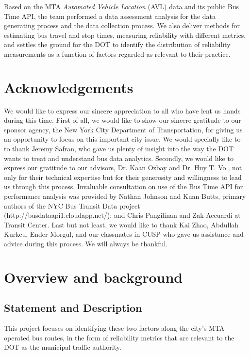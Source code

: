 \documentclass[12pt]{report}
\begin{document}
Based on the MTA \textit{Automated Vehicle Location} (AVL) data and its public Bus Time API, the team performed a data assessment analysis for the data generating process and the data collection process. We also deliver methods for estimating bus travel and stop times, measuring reliability with different metrics, and settles the ground for the DOT to identify the distribution of reliability measurements as a function of factors regarded as relevant to their practice.
        
\section*{Acknowledgements}

We would like to express our sincere appreciation to all who have lent us hands during this time.  First of all, we would like to show our sincere gratitude to our sponsor agency, the New York City Department of Transportation, for giving us an opportunity to focus on this important city issue.  We would specially like to to thank Jeremy Safran, who gave us plenty of insight into the way the DOT wants to treat and understand bus data analytics.  Secondly, we would like to express our gratitude to our advisors, Dr. Kaan Ozbay and Dr. Huy T. Vo., not only for their technical expertise but for their generosity and willingness to lead us through this process.  Invaluable consultation on use of the Bus Time API for performance analysis was provided by Nathan Johnson and Kuan Butts, primary authors of the NYC Bus Transit Data project (http://busdataapi1.cloudapp.net/); and Chris Pangilinan and Zak Accuardi at Transit Center.  Last but not least, we would like to thank Kai Zhao, Abdullah Kurkcu, Ender Morgul, and our classmates in CUSP who gave us assistance and advice during this process.  We will always be thankful.


\newpage

\section{Overview and background}


\subsection{	Statement and Description}
This project focuses on identifying these two factors along the city's MTA operated bus routes, in the form of reliability metrics that are relevant to the DOT as the municipal traffic authority.
\end{document}

